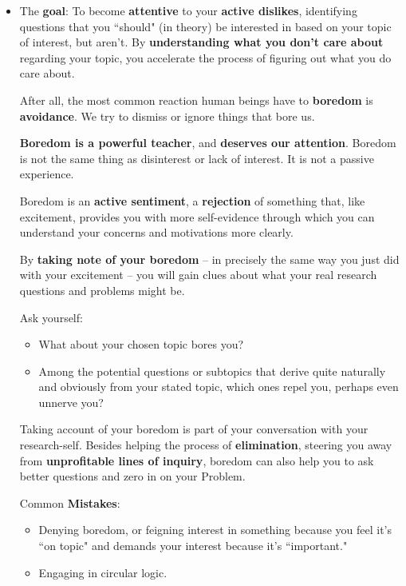 \documentclass[11pt]{article}
\begin{document}
\begin{itemize}
\item  \begin{exercise}

The \textbf{goal}: To become \textbf{attentive} to your \textbf{active dislikes}, identifying questions that you ``should" (in theory) be interested in based on your topic of interest, but aren’t. By \textbf{understanding what you don’t care about} regarding your topic, you accelerate the process of figuring out what you do care about.

After all, the most common reaction human beings have to \textbf{boredom} is \textbf{avoidance}. We try to dismiss or ignore things that bore us.

\textbf{Boredom is a powerful teacher}, and \textbf{deserves our attention}. Boredom is not the same thing as disinterest or lack of interest. It is not a passive experience. 

Boredom is an \textbf{active sentiment}, a \textbf{rejection} of something that, like excitement, provides you with more self-evidence through which you can understand your concerns and motivations more clearly. 

By \textbf{taking note of your boredom} -- in precisely the same way you just did with your excitement -- you will gain clues about what your real research questions and problems might be.

Ask yourself: 
\begin{itemize}
\item What about your chosen topic bores you? 

\item Among the potential questions or subtopics that derive quite naturally and obviously from your stated topic, which ones repel you, perhaps even unnerve you?
\end{itemize}

Taking account of your boredom is part of your conversation with your research-self. Besides helping the process of \textbf{elimination}, steering you away from \textbf{unprofitable lines of inquiry}, boredom can also help you to ask better questions and zero in on your Problem.
\end{exercise}
Common \textbf{Mistakes}:
\begin{itemize}
\item Denying boredom, or feigning interest in something because you feel it’s ``on topic" and demands your interest because it’s ``important."
\item Engaging in circular logic. 


\end{itemize}
\end{itemize}
\end{document}
